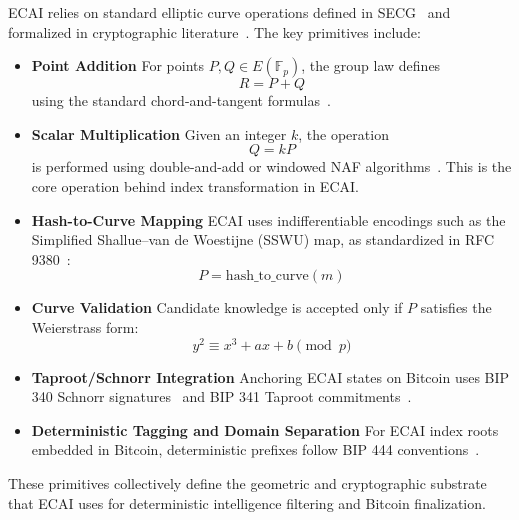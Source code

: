 \documentclass[11pt]{article}
\begin{document}
ECAI relies on standard elliptic curve operations defined in SECG~\cite{SECG, SECG2} and formalized in cryptographic literature~\cite{Silverman, Galbraith}. The key primitives include:

\begin{itemize}[noitemsep]

\item \textbf{Point Addition}  
For points $P, Q \in E(\mathbb{F}_p)$, the group law defines  
\[
R = P + Q
\]
using the standard chord-and-tangent formulas~\cite{Koblitz, Miller}.

\item \textbf{Scalar Multiplication}  
Given an integer $k$, the operation  
\[
Q = kP
\]
is performed using double-and-add or windowed NAF algorithms~\cite{Galbraith}. This is the core operation behind index transformation in ECAI.

\item \textbf{Hash-to-Curve Mapping}  
ECAI uses indifferentiable encodings such as the Simplified Shallue–van de Woestijne (SSWU) map, as standardized in RFC 9380~\cite{RFC9380}:
\[
P = \text{hash\_to\_curve}(m)
\]

\item \textbf{Curve Validation}  
Candidate knowledge is accepted only if $P$ satisfies the Weierstrass form:
\[
y^2 \equiv x^3 + ax + b \pmod{p}
\]

\item \textbf{Taproot/Schnorr Integration}  
Anchoring ECAI states on Bitcoin uses BIP 340 Schnorr signatures~\cite{BIP340} and BIP 341 Taproot commitments~\cite{BIP341}.

\item \textbf{Deterministic Tagging and Domain Separation}  
For ECAI index roots embedded in Bitcoin, deterministic prefixes follow BIP 444 conventions~\cite{BIP444}.

\end{itemize}

These primitives collectively define the geometric and cryptographic substrate that ECAI uses for deterministic intelligence filtering and Bitcoin finalization.
\end{document}
